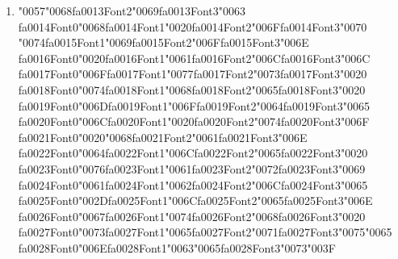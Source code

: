 \documentclass[12pt]{article}
\begin{document}
\begin{enumerate}[label=Q\arabic*.]
\begin{enumerate}[label=(\Alph*)]
    \item To store the final output of the entire sequence.
    \item To act as a memory that carries information from previous time steps
    \item To calculate the loss function for the current word
    \item To normalize the input embeddings
\end{enumerate}
\item {\char"0057}{\char"0068}{\csname fa0013Font2\endcsname\char"0069}{\csname fa0013Font3\endcsname\char"0063} {\csname fa0014Font0\endcsname\char"0068}{\csname fa0014Font1\endcsname\char"0020}{\csname fa0014Font2\endcsname\char"006F}{\csname fa0014Font3\endcsname\char"0070} {\char"0074}{\csname fa0015Font1\endcsname\char"0069}{\csname fa0015Font2\endcsname\char"006F}{\csname fa0015Font3\endcsname\char"006E} {\csname fa0016Font0\endcsname\char"0020}{\csname fa0016Font1\endcsname\char"0061}{\csname fa0016Font2\endcsname\char"006C}{\csname fa0016Font3\endcsname\char"006C} {\csname fa0017Font0\endcsname\char"006F}{\csname fa0017Font1\endcsname\char"0077}{\csname fa0017Font2\endcsname\char"0073}{\csname fa0017Font3\endcsname\char"0020} {\csname fa0018Font0\endcsname\char"0074}{\csname fa0018Font1\endcsname\char"0068}{\csname fa0018Font2\endcsname\char"0065}{\csname fa0018Font3\endcsname\char"0020} {\csname fa0019Font0\endcsname\char"006D}{\csname fa0019Font1\endcsname\char"006F}{\csname fa0019Font2\endcsname\char"0064}{\csname fa0019Font3\endcsname\char"0065} {\csname fa0020Font0\endcsname\char"006C}{\csname fa0020Font1\endcsname\char"0020}{\csname fa0020Font2\endcsname\char"0074}{\csname fa0020Font3\endcsname\char"006F} {\csname fa0021Font0\endcsname\char"0020}{\char"0068}{\csname fa0021Font2\endcsname\char"0061}{\csname fa0021Font3\endcsname\char"006E} {\csname fa0022Font0\endcsname\char"0064}{\csname fa0022Font1\endcsname\char"006C}{\csname fa0022Font2\endcsname\char"0065}{\csname fa0022Font3\endcsname\char"0020} {\csname fa0023Font0\endcsname\char"0076}{\csname fa0023Font1\endcsname\char"0061}{\csname fa0023Font2\endcsname\char"0072}{\csname fa0023Font3\endcsname\char"0069} {\csname fa0024Font0\endcsname\char"0061}{\csname fa0024Font1\endcsname\char"0062}{\csname fa0024Font2\endcsname\char"006C}{\csname fa0024Font3\endcsname\char"0065} {\csname fa0025Font0\endcsname\char"002D}{\csname fa0025Font1\endcsname\char"006C}{\csname fa0025Font2\endcsname\char"0065}{\csname fa0025Font3\endcsname\char"006E} {\csname fa0026Font0\endcsname\char"0067}{\csname fa0026Font1\endcsname\char"0074}{\csname fa0026Font2\endcsname\char"0068}{\csname fa0026Font3\endcsname\char"0020} {\csname fa0027Font0\endcsname\char"0073}{\csname fa0027Font1\endcsname\char"0065}{\csname fa0027Font2\endcsname\char"0071}{\csname fa0027Font3\endcsname\char"0075}{\char"0065} {\csname fa0028Font0\endcsname\char"006E}{\csname fa0028Font1\endcsname\char"0063}{\char"0065}{\csname fa0028Font3\endcsname\char"0073}{\char"003F}

\end{enumerate}
\end{document}
